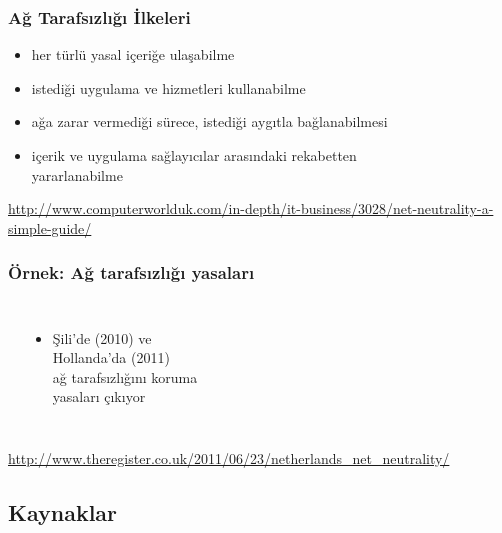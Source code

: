 \documentclass[dvipsnames]{beamer}
\theoremstyle{plain}
\begin{document}
\begin{frame}
  \frametitle{Ağ Tarafsızlığı İlkeleri}

  \begin{itemize}
    \item her türlü yasal içeriğe ulaşabilme
    \item istediği uygulama ve hizmetleri kullanabilme
    \item ağa zarar vermediği sürece, istediği aygıtla bağlanabilmesi
    \item içerik ve uygulama sağlayıcılar arasındaki rekabetten\\
      yararlanabilme
  \end{itemize}

  \medskip
  \tiny{\url{http://www.computerworlduk.com/in-depth/it-business/3028/net-neutrality-a-simple-guide/}}\\
\end{frame}

\begin{frame}
  \frametitle{Örnek: Ağ tarafsızlığı yasaları}

  \begin{columns}
    \begin{center}
    \end{center}

    \begin{itemize}
      \item Şili'de (2010) ve\\
        Hollanda'da (2011)\\
        ağ tarafsızlığını koruma\\
        yasaları çıkıyor
    \end{itemize}
  \end{columns}

  \medskip
  \tiny{\url{http://www.theregister.co.uk/2011/06/23/netherlands_net_neutrality/}}\\
\end{frame}

\subsection*{Kaynaklar}
\end{document}
